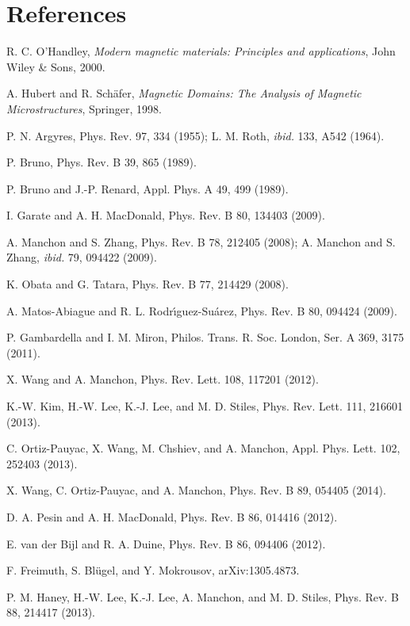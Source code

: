 \documentclass[12pt]{iopart}
\begin{document}
\section*{References}
\begin{thebibliography}{99}
R. C. O'Handley, \textit{Modern magnetic materials: Principles and applications}, John Wiley \& Sons, 2000.

A. Hubert and R. Sch\"{a}fer, \textit{Magnetic Domains: The Analysis of Magnetic Microstructures}, Springer, 1998.

P. N. Argyres, Phys. Rev. 97, 334 (1955); L. M. Roth, \textit{ibid.} 133, A542 (1964).

P. Bruno, Phys. Rev. B 39, 865 (1989).

P. Bruno and J.-P. Renard, Appl. Phys. A 49, 499 (1989).

I. Garate and A. H. MacDonald, Phys. Rev. B 80, 134403 (2009).

A. Manchon and S. Zhang, Phys. Rev. B 78, 212405 (2008); A. Manchon and S. Zhang, \textit{ibid.} 79, 094422 (2009).

K. Obata and G. Tatara, Phys. Rev. B 77, 214429 (2008).

A. Matos-Abiague and R. L. Rodr\'{\i}guez-Su\'{a}rez, Phys. Rev. B 80, 094424 (2009).

P. Gambardella and I. M. Miron, Philos. Trans. R. Soc. London, Ser. A 369, 3175 (2011).

X. Wang and A. Manchon, Phys. Rev. Lett. 108, 117201 (2012).

K.-W. Kim, H.-W. Lee, K.-J. Lee, and M. D. Stiles, Phys. Rev. Lett. 111, 216601 (2013).

C. Ortiz-Pauyac, X. Wang, M. Chshiev, and A. Manchon, Appl. Phys. Lett. 102, 252403 (2013).

X. Wang, C. Ortiz-Pauyac, and A. Manchon, Phys. Rev. B 89, 054405 (2014).

D. A. Pesin and A. H. MacDonald, Phys. Rev. B 86, 014416 (2012).

E. van der Bijl and R. A. Duine, Phys. Rev. B 86, 094406 (2012).

F. Freimuth, S. Bl\"{u}gel, and Y. Mokrousov, arXiv:1305.4873.

P. M. Haney, H.-W. Lee, K.-J. Lee, A. Manchon, and M. D. Stiles, Phys. Rev. B 88, 214417 (2013).


\end{thebibliography}
\end{document}
